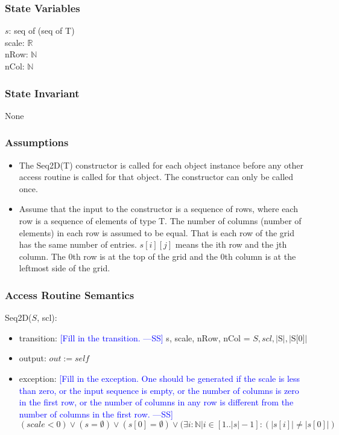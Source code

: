 \documentclass[12pt]{article}
\newcommand{\authornote}[3]{\textcolor{#1}{[#3 ---#2]}}
\newcommand{\authornote}[3]{}
\newcommand{\wss}[1]{\authornote{blue}{SS}{#1}}
\begin{document}
\subsubsection* {State Variables}

$s$: seq of (seq of T)\\
scale: $\mathbb{R}$\\
nRow: $\mathbb{N}$\\
nCol: $\mathbb{N}$

\subsubsection* {State Invariant}

None

\subsubsection* {Assumptions}

\begin{itemize}
\item The Seq2D(T) constructor is called for each object instance before any
other access routine is called for that object.  The constructor can only be
called once.
\item Assume that the input to the constructor is a sequence of rows, where each
  row is a sequence of elements of type T.  The number of columns (number of
  elements) in each row is assumed to be equal. That is each row
  of the grid has the same number of entries.  $s[i][j]$ means the ith row and
  the jth column.  The 0th row is at the top of the grid and the 0th column
  is at the leftmost side of the grid.
\end{itemize}

\subsubsection* {Access Routine Semantics}

Seq2D($S$, scl):
\begin{itemize}
\item transition: \wss{Fill in the transition.} s, scale, nRow, nCol = $S, scl, |\text{S}|, |\text{S[0]}|$
\item output: $\mathit{out} := \mathit{self}$
\item exception: \wss{Fill in the exception.  One should be generated if the
    scale is less than zero, or the input sequence is empty, or the number of
    columns is zero in the first row, or the number of columns in any row is
    different from the number of columns in the first row.} $(scale < 0) \lor (s = \emptyset) \lor (s[0] = \emptyset) \lor (\exists i: \mathbb{N} | i \in [1 .. |s|-1] : (|s[i]| \neq |s[0]|)$
\end{itemize}
\end{document}
